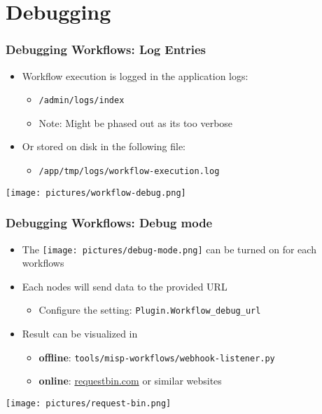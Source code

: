 \section{Debugging}
\begin{frame}
    \frametitle{Debugging Workflows: Log Entries}
    \begin{itemize}
        \item Workflow execution is logged in the application logs:
        \begin{itemize}
            \item \texttt{/admin/logs/index}
            \item Note: Might be phased out as its too verbose
        \end{itemize}
        \item Or stored on disk in the following file:
        \begin{itemize}
            \item \texttt{/app/tmp/logs/workflow-execution.log}
        \end{itemize}
    \end{itemize}
    \begin{center}
        \texttt{[image: pictures/workflow-debug.png]}
    \end{center}
\end{frame}

\begin{frame}
    \frametitle{Debugging Workflows: Debug mode}
    \begin{itemize}
        \item The \texttt{[image: pictures/debug-mode.png]} can be turned on for each workflows
        \item Each nodes will send data to the provided URL
        \begin{itemize}
            \item Configure the setting: \texttt{Plugin.Workflow\_debug\_url}
        \end{itemize}
        \item Result can be visualized in
        \begin{itemize}
            \item \textbf{offline}: \texttt{tools/misp-workflows/webhook-listener.py}
            \item \textbf{online}: \url{requestbin.com} or similar websites
        \end{itemize}
    \end{itemize}
    \begin{center}
        \texttt{[image: pictures/request-bin.png]}
    \end{center}
\end{frame}

